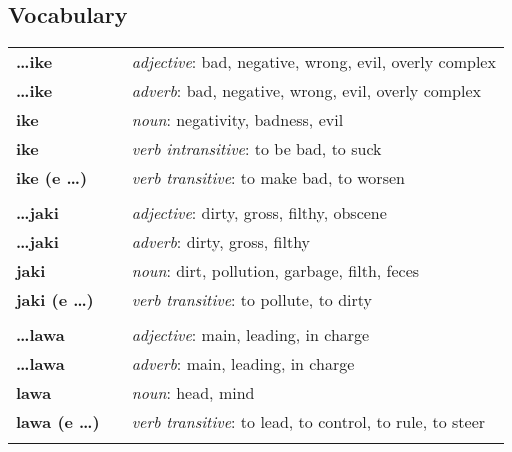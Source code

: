 \subsection*{Vocabulary}
\begin{supertabular}{p{2,5cm}|ll}
\textbf{\dots ike} && \textit{adjective}: bad, negative, wrong, evil, overly complex \\ %
\textbf{\dots ike} && \textit{adverb}: bad, negative, wrong, evil, overly complex \\ %
\textbf{ike} && \textit{noun}: negativity, badness, evil \\ %
\textbf{ike} && \textit{verb intransitive}: to be bad, to suck \\ %
\textbf{ike (e \dots)} && \textit{verb transitive}: to make bad, to worsen \\ %
 && \\ %
\textbf{\dots jaki} && \textit{adjective}: dirty, gross, filthy, obscene \\ %
\textbf{\dots jaki} && \textit{adverb}: dirty, gross, filthy \\ %
\textbf{jaki} && \textit{noun}: dirt, pollution, garbage, filth, feces \\ %
\textbf{jaki (e \dots)} && \textit{verb transitive}: to pollute, to dirty \\ %
 && \\ %
\textbf{\dots lawa} && \textit{adjective}: main, leading, in charge \\ %
\textbf{\dots lawa} && \textit{adverb}: main, leading, in charge \\ %
\textbf{lawa} && \textit{noun}: head, mind \\ %
\textbf{lawa (e \dots)} && \textit{verb transitive}: to lead, to control, to rule, to steer \\ %
 && \\ %

\end{supertabular}
